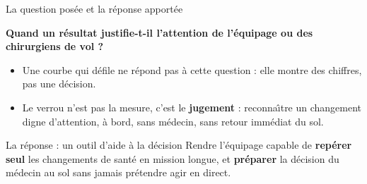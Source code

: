 \documentclass[aspectratio=169,11pt]{beamer}
\begin{document}
\begin{frame}{La question pos\'ee et la r\'eponse apport\'ee}
\begin{center}
\vspace{0.1cm}
{\color{cyanH}\Large\bfseries \og{}Quand un r\'esultat justifie-t-il l'attention de l'\'equipage ou des chirurgiens de vol ?\fg{}}
\vspace{0.1cm}
\end{center}
\vspace{0.1cm}
\begin{itemize}
  \item Une courbe qui d\'efile ne r\'epond pas \`a cette question : elle montre des chiffres, pas une d\'ecision.
  \item Le verrou n'est pas la mesure, c'est le \textbf{jugement} : reconna\^{\i}tre un changement digne d'attention, \`a bord, sans m\'edecin, sans retour imm\'ediat du sol.
\end{itemize}
\vspace{0.15cm}
\begin{block}{La r\'eponse : un outil d'aide \`a la d\'ecision}
\small
Rendre l'\'equipage capable de \textbf{rep\'erer seul} les changements de sant\'e en mission longue, et \textbf{pr\'eparer} la d\'ecision du m\'edecin au sol sans jamais pr\'etendre agir en direct.
\end{block}
\end{frame}
\end{document}
